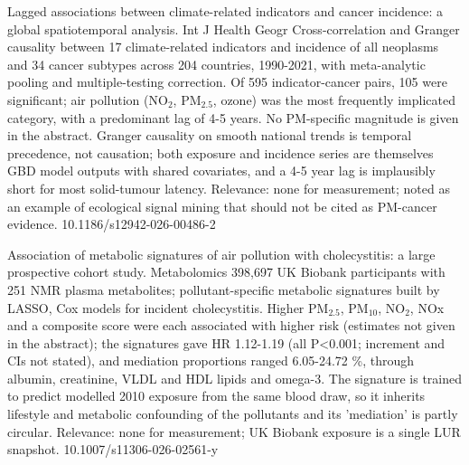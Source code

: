 \documentclass[10pt]{article}
\begin{document}
{Lagged associations between climate-related indicators and cancer incidence: a global spatiotemporal analysis.}
{Int J Health Geogr}
{Cross-correlation and Granger causality between 17 climate-related indicators and incidence of all neoplasms and 34 cancer subtypes across 204 countries, 1990-2021, with meta-analytic pooling and multiple-testing correction. Of 595 indicator-cancer pairs, 105 were significant; air pollution (NO$_2$, PM$_{2.5}$, ozone) was the most frequently implicated category, with a predominant lag of 4-5 years. No PM-specific magnitude is given in the abstract. Granger causality on smooth national trends is temporal precedence, not causation; both exposure and incidence series are themselves GBD model outputs with shared covariates, and a 4-5 year lag is implausibly short for most solid-tumour latency. Relevance: none for measurement; noted as an example of ecological signal mining that should not be cited as PM-cancer evidence.}
{10.1186/s12942-026-00486-2}

\par{}\baselineskip{}\baselineskip
{}

{Association of metabolic signatures of air pollution with cholecystitis: a large prospective cohort study.}
{Metabolomics}
{398,697 UK Biobank participants with 251 NMR plasma metabolites; pollutant-specific metabolic signatures built by LASSO, Cox models for incident cholecystitis. Higher PM$_{2.5}$, PM$_{10}$, NO$_2$, NOx and a composite score were each associated with higher risk (estimates not given in the abstract); the signatures gave HR 1.12-1.19 (all P<0.001; increment and CIs not stated), and mediation proportions ranged 6.05-24.72 \%, through albumin, creatinine, VLDL and HDL lipids and omega-3. The signature is trained to predict modelled 2010 exposure from the same blood draw, so it inherits lifestyle and metabolic confounding of the pollutants and its 'mediation' is partly circular. Relevance: none for measurement; UK Biobank exposure is a single LUR snapshot.}
{10.1007/s11306-026-02561-y}
\end{document}
